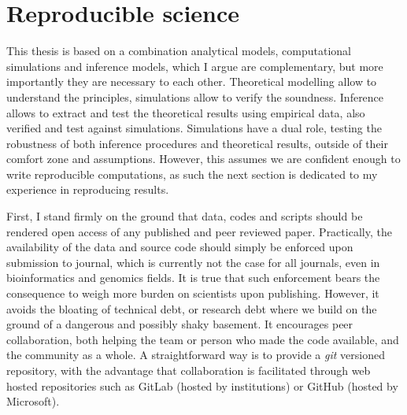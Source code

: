 \section{Reproducible science}
\label{sec:reproducible-science}

This thesis is based on a combination analytical models, computational simulations and inference models, which I argue are complementary, but more importantly they are necessary to each other.
Theoretical modelling allow to understand the principles, simulations allow to verify the soundness.
Inference allows to extract and test the theoretical results using empirical data, also verified and test against simulations.
Simulations have a dual role, testing the robustness of both inference procedures and theoretical results, outside of their comfort zone and assumptions.
However, this assumes we are confident enough to write reproducible computations, as such the next section is dedicated to my experience in reproducing results.

First, I stand firmly on the ground that data, codes and scripts should be rendered open access of any published and peer reviewed paper.
Practically, the availability of the data and source code should simply be enforced upon submission to journal, which is currently not the case for all journals, even in bioinformatics and genomics fields.
It is true that such enforcement bears the consequence to weigh more burden on scientists upon publishing.
However, it avoids the bloating of technical debt, or research debt where we build on the ground of a dangerous and possibly shaky basement.
It encourages peer collaboration, both helping the team or person who made the code available, and the community as a whole.
A straightforward way is to provide a \textit{git} versioned repository, with the advantage that collaboration is facilitated through web hosted repositories such as GitLab (hosted by institutions) or GitHub (hosted by Microsoft).

